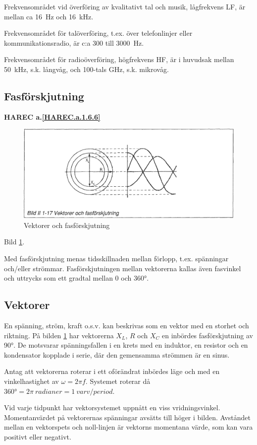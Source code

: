 Frekvensområdet vid överföring av kvalitativt tal och musik, lågfrekvens LF, är
mellan ca 16~Hz och 16~kHz.

Frekvensområdet för talöverföring, t.ex. över telefonlinjer eller
kommunikationsradio, är c:a 300 till 3000~Hz.

Frekvensområdet för radioöverföring, högfrekvens HF, är i huvudsak mellan
50~kHz, s.k. långvåg, och 100-tals GHz, s.k. mikrovåg.

\subsection{Fasförskjutning}
\textbf{HAREC a.\ref{HAREC.a.1.6.6}\label{myHAREC.a.1.6.6}}

\begin{figure}[h]
\includegraphics[width=\textwidth]{images/bild_2_1-17}
\caption{Vektorer och fasförskjutning}
\label{fig:BildII1-17}
\end{figure}

Bild \ref{fig:BildII1-17}.

Med fasförskjutning menas tidsskillnaden mellan förlopp, t.ex. spänningar
och/eller strömmar. Fasförskjutningen mellan vektorerna kallas även fasvinkel
och uttrycks som ett gradtal mellan 0 och 360°.

\subsection{Vektorer}

En spänning, ström, kraft o.s.v. kan beskrivas som en vektor med en storhet och
riktning. På bilden \ref{fig:BildII1-17} har vektorerna \(X_L\), \(R\)
och \(X_C\) en inbördes fasförskjutning av 90°. De motsvarar spänningsfallen i
en krets med en induktor, en resistor och en kondensator kopplade i serie,
där den gemensamma strömmen är en sinus.

Antag att vektorerna roterar i ett oförändrat inbördes läge och med en
vinkelhastighet av \(\omega= 2\pi f\). Systemet roterar då
\(360° = 2\pi\ radianer = 1\ varv/period\).

Vid varje tidpunkt har vektorsystemet uppnått en viss vridningsvinkel.
Momentanvärdet på vektorernas spänningar avsätts till höger i bilden. Avståndet
mellan en vektorspets och noll-linjen är vektorns momentana värde, som kan vara
positivt eller negativt.
